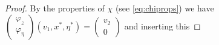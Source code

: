 \documentclass[
	fontsize=11pt, 
	twoside=false, 
	abstract=true, 
	a4paper,
]{scrartcl}
\newcommand{\RR}{\mathbb{R}}
\newcommand{\abs}[1]{\left\lvert#1\right\rvert}
\newcommand{\del}{\partial}
\begin{document}
\begin{proof}
	By the properties of $\chi$ (see \cref{eq:chiprops}) we have $\begin{pmatrix}\varphi_z\\\varphi_\eta\end{pmatrix}(v_1,x^\ast,\eta^\ast) = \begin{pmatrix}v_2\\0\end{pmatrix}$ and inserting this %

\end{proof}
\end{document}
